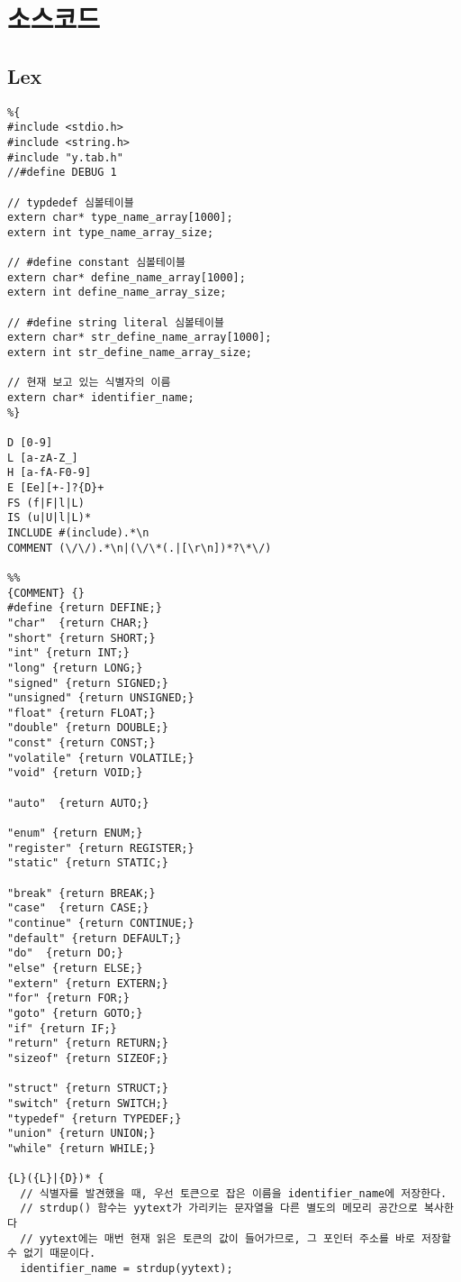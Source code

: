 \documentclass{article}
\begin{document}
\section{소스코드}
\subsection{Lex}
\begin{verbatim}
%{
#include <stdio.h>
#include <string.h>
#include "y.tab.h"
//#define DEBUG 1

// typdedef 심볼테이블
extern char* type_name_array[1000];
extern int type_name_array_size;         

// #define constant 심볼테이블
extern char* define_name_array[1000];
extern int define_name_array_size;

// #define string literal 심볼테이블
extern char* str_define_name_array[1000];
extern int str_define_name_array_size;

// 현재 보고 있는 식별자의 이름
extern char* identifier_name;             
%}

D [0-9]
L [a-zA-Z_]
H [a-fA-F0-9]
E [Ee][+-]?{D}+
FS (f|F|l|L)
IS (u|U|l|L)*
INCLUDE #(include).*\n
COMMENT (\/\/).*\n|(\/\*(.|[\r\n])*?\*\/)

%%
{COMMENT} {}
#define {return DEFINE;}
"char"  {return CHAR;}
"short" {return SHORT;}
"int" {return INT;}
"long" {return LONG;}
"signed" {return SIGNED;}
"unsigned" {return UNSIGNED;}
"float" {return FLOAT;}
"double" {return DOUBLE;}
"const" {return CONST;}
"volatile" {return VOLATILE;}
"void" {return VOID;}

"auto"  {return AUTO;}

"enum" {return ENUM;}
"register" {return REGISTER;}
"static" {return STATIC;}

"break" {return BREAK;}
"case"  {return CASE;}
"continue" {return CONTINUE;}
"default" {return DEFAULT;}
"do"  {return DO;}
"else" {return ELSE;}
"extern" {return EXTERN;}
"for" {return FOR;}
"goto" {return GOTO;}
"if" {return IF;}
"return" {return RETURN;}
"sizeof" {return SIZEOF;}

"struct" {return STRUCT;}
"switch" {return SWITCH;}
"typedef" {return TYPEDEF;}
"union" {return UNION;}
"while" {return WHILE;}

{L}({L}|{D})* {
  // 식별자를 발견했을 때, 우선 토큰으로 잡은 이름을 identifier_name에 저장한다.
  // strdup() 함수는 yytext가 가리키는 문자열을 다른 별도의 메모리 공간으로 복사한다
  // yytext에는 매번 현재 읽은 토큰의 값이 들어가므로, 그 포인터 주소를 바로 저장할 수 없기 때문이다.
  identifier_name = strdup(yytext);
  

\end{verbatim}
\end{document}
